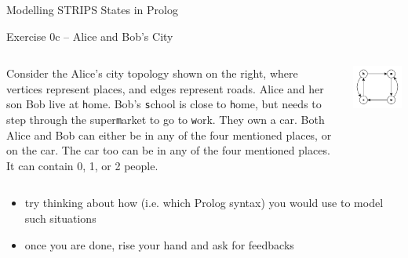\documentclass[presentation]{beamer}\mode<presentation>{\usetheme{AMSBolognaFC}}
\begin{document}
\begin{frame}[allowframebreaks]{Modelling STRIPS States in Prolog}
\begin{block}{Exercise 0c -- Alice and Bob's City}
	\begin{columns}
		\begin{column}{.7\linewidth}
			Consider the Alice's city topology shown on the right, where vertices represent places, and edges represent roads.
			Alice and her son Bob live at \alert{\texttt{h}}ome.
			Bob's \alert{\texttt{s}}chool is close to \alert{\texttt{h}}ome, but needs to step through the super\alert{\texttt{m}}arket to go to \alert{\texttt{w}}ork.
			They own a car.
			Both Alice and Bob can either be in any of the four mentioned places, or on the car.
			The car too can be in any of the four mentioned places.
			It can contain 0, 1, or 2 people.
		\end{column}
		\begin{column}{.3\linewidth}
			\includegraphics[width=\linewidth]{./figures/city.pdf}
		\end{column}
	\end{columns}
\end{block}

\begin{itemize}
	\item try thinking about \alert{how} (i.e. which Prolog syntax) you would use to model such situations

	\item once you are done, rise your hand and ask for feedbacks
\end{itemize}
\end{frame}
\end{document}
